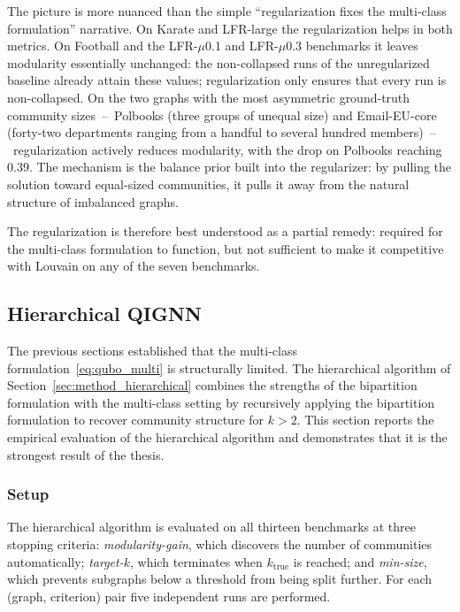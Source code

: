 The picture is more nuanced than the simple
``regularization fixes the multi-class formulation'' narrative.
On Karate and LFR-large the regularization helps in both
metrics. On Football and the LFR-$\mu$0.1 and LFR-$\mu$0.3
benchmarks it leaves modularity essentially unchanged: the
non-collapsed runs of the unregularized baseline already attain
these values; regularization only ensures that every run is
non-collapsed. On the two graphs with the most asymmetric
ground-truth community sizes~--~Polbooks (three groups of
unequal size) and Email-EU-core (forty-two departments ranging
from a handful to several hundred members)~--~regularization
actively reduces modularity, with the drop on Polbooks reaching
$0.39$. The mechanism is the balance prior built into the
regularizer: by pulling the solution toward equal-sized
communities, it pulls it away from the natural structure of
imbalanced graphs.

The regularization is therefore best understood as a partial
remedy: required for the multi-class formulation to function,
but not sufficient to make it competitive with Louvain on any of
the seven benchmarks.

\subsection{Hierarchical QIGNN}
\label{sec:exp_hierarchical}

The previous sections established that the multi-class
formulation~\eqref{eq:qubo_multi} is structurally limited.
The hierarchical algorithm of
Section~\ref{sec:method_hierarchical} combines the strengths of
the bipartition formulation with the multi-class setting by
recursively applying the bipartition formulation to recover
community structure for $k > 2$. This section reports the
empirical evaluation of the hierarchical algorithm and
demonstrates that it is the strongest result of the thesis.

\subsubsection{Setup}
\label{sec:exp_hierarchical_setup}

The hierarchical algorithm is evaluated on all thirteen
benchmarks at three stopping criteria: \emph{modularity-gain},
which discovers the number of communities automatically;
\emph{target-$k$}, which terminates when $k_{\mathrm{true}}$ is
reached; and \emph{min-size}, which prevents subgraphs below a
threshold from being split further. For each (graph, criterion)
pair five independent runs are performed.


